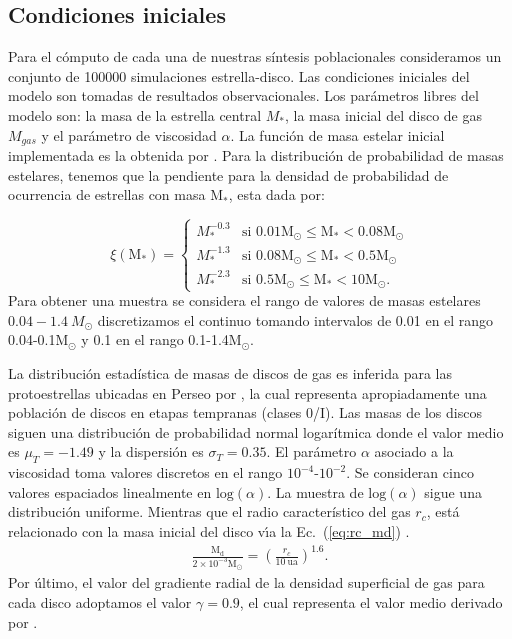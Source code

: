 \documentclass[baaa]{baaa}
\begin{document}
\subsection{Condiciones iniciales}
Para el c\'omputo de cada una de nuestras síntesis  poblacionales consideramos un conjunto de 100000 simulaciones estrella-disco. Las condiciones iniciales del modelo son tomadas de resultados observacionales. Los parámetros libres del modelo son: la masa de la estrella central $M_{*}$, la masa inicial del disco de gas $M_{gas}$ y el par\'ametro de viscosidad $\alpha$. La función de masa estelar inicial implementada es la obtenida por \cite{kroupa2001}. Para la distribución de probabilidad de masas estelares, tenemos que la pendiente para la densidad de probabilidad de ocurrencia de estrellas con masa $\text{M}_{*}$, esta dada por:

\begin{equation}
    \xi (\text{M}_{*}) = 
   \begin{cases} 
      M^{-0.3}_{*}              & \mbox{si } 0.01\text{M}_{\odot}\leq \text{M}_{*}< 0.08\text{M}_{\odot}   \\
      M^{-1.3}_{*}              & \mbox{si } 0.08\text{M}_{\odot}\leq \text{M}_{*}< 0.5\text{M}_{\odot}   \\
      M^{-2.3}_{*}              & \mbox{si } 0.5\text{M}_{\odot}\leq \text{M}_{*}< 10\text{M}_{\odot}.
   \end{cases}
\end{equation}
Para obtener una muestra se considera el rango de valores de masas estelares $0.04-1.4~M_{\odot}$ discretizamos el continuo tomando intervalos de 0.01 en el rango 0.04-0.1$\mathrm{M}_{\odot}$ y 0.1 en el rango 0.1-1.4$\mathrm{M}_{\odot}$.

La distribución estadística de masas de discos de gas es inferida para las protoestrellas ubicadas en Perseo por \cite{tychoniec2018vla}, la cual representa apropiadamente una población de discos en etapas tempranas (clases 0/I). Las masas de los discos siguen una distribución de probabilidad normal logarítmica donde el valor medio es $\mu_T = -1.49$ y la dispersión es $\sigma_T = 0.35$. El par\'ametro $\alpha$ asociado a la viscosidad toma valores discretos en el rango $10^{-4}$-$10^{-2}$. Se consideran cinco valores espaciados linealmente en  $\mathrm{log}(\alpha)$. La muestra de $\mathrm{log}(\alpha)$ sigue una distribución uniforme. Mientras que el radio característico del gas $r_{c}$, est\'a relacionado con la masa inicial del disco v\'{\i}a la Ec.~(\ref{eq:rc_md}) \citep{andrews2010protoplanetary}.
\begin{align}
    \frac{\text{M}_{\text{d}}}{2 \times 10^{-3} \mathrm{M}_{\odot}} = \left( \frac{r_{c}}{10~\text{ua}}\right)^{1.6}. 
    \label{eq:rc_md}
\end{align}
Por \'ultimo, el valor del gradiente radial de la densidad superficial de gas para cada disco adoptamos el valor $\gamma=0.9$, el cual representa el valor medio derivado por \cite{Andrews_2010}. 
\end{document}
